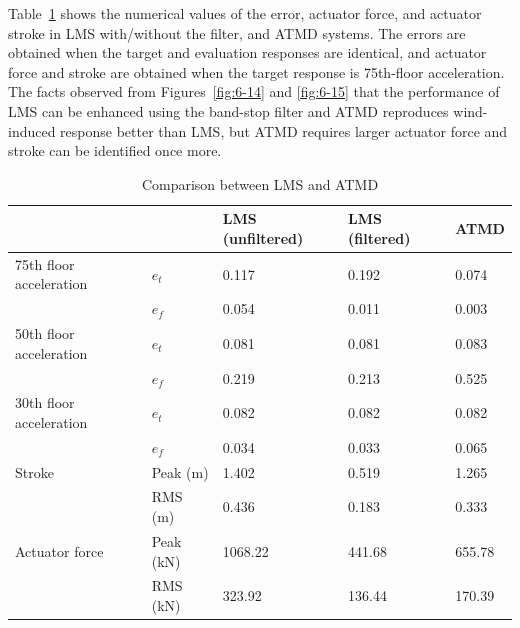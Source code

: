 Table~\ref{tab:6-2} shows the numerical values of the error, actuator force, and actuator stroke in LMS with/without the filter, and ATMD systems. The errors are obtained when the target and evaluation responses are identical, and actuator force and stroke are obtained when the target response is 75th-floor acceleration. The facts observed from Figures~\ref{fig:6-14} and \ref{fig:6-15} that the performance of LMS can be enhanced using the band-stop filter and ATMD reproduces wind-induced response better than LMS, but ATMD requires larger actuator force and stroke can be identified once more.

\begin{table}[ht]
\centering
\begin{tabularx}{\textwidth}{@{}XX|X|X|X@{}}
\toprule[1pt]\midrule[0.3pt]
&& LMS (unfiltered) & LMS (filtered) & ATMD \\ \hline
75th floor acceleration & $e_{t}$ & 0.117 & 0.192 & 0.074 \\
& $e_{f}$ & 0.054 & 0.011 & 0.003 \\ \hline
50th floor acceleration & $e_{t}$ & 0.081 & 0.081 & 0.083 \\
& $e_{f}$ & 0.219 & 0.213 & 0.525 \\ \hline
30th floor acceleration & $e_{t}$ & 0.082 & 0.082 & 0.082 \\
& $e_{f}$ & 0.034 & 0.033 & 0.065 \\ \hline
Stroke & Peak (m) & 1.402 & 0.519 & 1.265 \\
& RMS (m) & 0.436 & 0.183 & 0.333 \\ \hline
Actuator force & Peak (kN) & 1068.22 & 441.68 & 655.78 \\
& RMS (kN) & 323.92 & 136.44 & 170.39 \\
\bottomrule
\end{tabularx}
\caption{Comparison between LMS and ATMD}
\label{tab:6-2}
\end{table}

